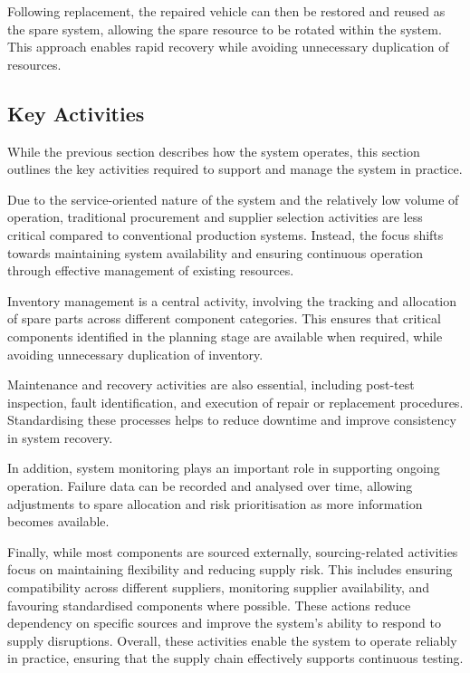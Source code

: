 \documentclass[11pt, a4paper]{report}
\numberwithin{equation}{section}
\begin{document}
Following replacement, the repaired vehicle can then be restored and reused as the spare system, allowing the spare resource to be rotated within the system. This approach enables rapid recovery while avoiding unnecessary duplication of resources.

\subsection{Key Activities}

While the previous section describes how the system operates, this section outlines the key activities required to support and manage the system in practice.

Due to the service-oriented nature of the system and the relatively low volume of operation, traditional procurement and supplier selection activities are less critical compared to conventional production systems. Instead, the focus shifts towards maintaining system availability and ensuring continuous operation through effective management of existing resources.

Inventory management is a central activity, involving the tracking and allocation of spare parts across different component categories. This ensures that critical components identified in the planning stage are available when required, while avoiding unnecessary duplication of inventory.

Maintenance and recovery activities are also essential, including post-test inspection, fault identification, and execution of repair or replacement procedures. Standardising these processes helps to reduce downtime and improve consistency in system recovery.

In addition, system monitoring plays an important role in supporting ongoing operation. Failure data can be recorded and analysed over time, allowing adjustments to spare allocation and risk prioritisation as more information becomes available.

Finally, while most components are sourced externally, sourcing-related activities focus on maintaining flexibility and reducing supply risk. This includes ensuring compatibility across different suppliers, monitoring supplier availability, and favouring standardised components where possible. These actions reduce dependency on specific sources and improve the system's ability to respond to supply disruptions. Overall, these activities enable the system to operate reliably in practice, ensuring that the supply chain effectively supports continuous testing.
\end{document}

